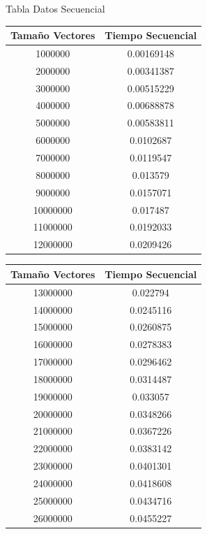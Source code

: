 \documentclass[12pt]{beamer}
\begin{document}
\begin{frame}{Tabla Datos Secuencial}
\centering
\begin{tabular}{|c|c|}
\hline 
Tamaño Vectores & Tiempo Secuencial \\ 
\hline 
1000000 & 0.00169148 \\ 
\hline 
2000000 & 0.00341387 \\ 
\hline 
3000000 & 0.00515229 \\ 
\hline 
4000000 & 0.00688878 \\ 
\hline 
5000000 & 0.00583811 \\ 
\hline 
6000000 & 0.0102687 \\ 
\hline 
7000000 & 0.0119547 \\ 
\hline 
8000000 & 0.013579 \\ 
\hline 
9000000 & 0.0157071 \\ 
\hline 
10000000 & 0.017487 \\ 
\hline 
11000000 & 0.0192033 \\ 
\hline 
12000000 & 0.0209426 \\ 
\hline
\end{tabular}
\end{frame}

\begin{frame}
\centering
\begin{tabular}{|c|c|}
\hline 
Tamaño Vectores & Tiempo Secuencial \\
\hline
13000000 & 0.022794 \\ 
\hline 
14000000 & 0.0245116 \\ 
\hline 
15000000 & 0.0260875 \\ 
\hline 
16000000 & 0.0278383 \\ 
\hline 
17000000 & 0.0296462 \\ 
\hline 
18000000 & 0.0314487 \\ 
\hline 
19000000 & 0.033057 \\ 
\hline 
20000000 & 0.0348266 \\ 
\hline 
21000000 & 0.0367226 \\ 
\hline 
22000000 & 0.0383142 \\ 
\hline 
23000000 & 0.0401301 \\ 
\hline 
24000000 & 0.0418608 \\ 
\hline 
25000000 & 0.0434716 \\ 
\hline 
26000000 & 0.0455227 \\ 
\hline 
\end{tabular} 
\end{frame}
\end{document}
